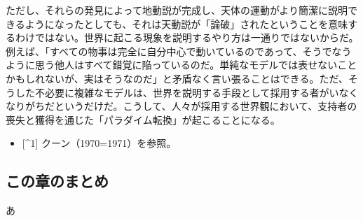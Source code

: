 ただし、それらの発見によって地動説が完成し、天体の運動がより簡潔に説明できるようになったとしても、それは天動説が「論破」されたということを意味するわけではない。世界に起こる現象を説明するやり方は一通りではないからだ。例えば、「すべての物事は完全に自分中心で動いているのであって、そうでなうように思う他人はすべて錯覚に陥っているのだ。単純なモデルでは表せないことかもしれないが、実はそうなのだ」と矛盾なく言い張ることはできる。ただ、そうした不必要に複雑なモデルは、世界を説明する手段として採用する者がいなくなりがちだというだけだ。こうして、人々が採用する世界観において、支持者の喪失と獲得を通じた「パラダイム転換」が起こることになる。

\begin{itemize}
\tightlist
\item
  {[}\^{}1{]} クーン（1970=1971）を参照。
\end{itemize}

\subsection{この章のまとめ}\label{ux3053ux306eux7ae0ux306eux307eux3068ux3081}

あ
